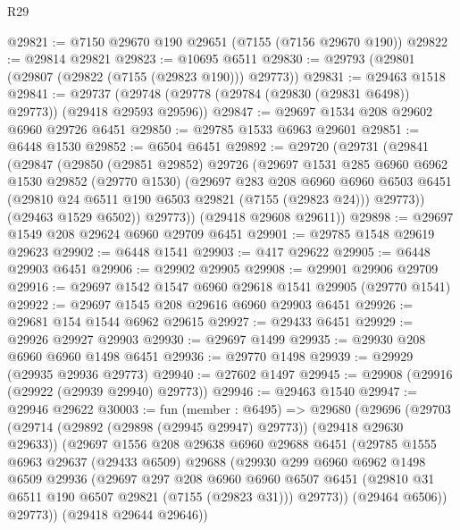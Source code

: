 \begin{lexlean}{R29}
\begin{coremodule}
@29821 := @7150 @29670 @190 @29651 (@7155 (@7156 @29670 @190))
@29822 := @29814 @29821
@29823 := @10695 @6511
@29830 := @29793 (@29801 (@29807 (@29822 (@7155 (@29823 @190))) @29773))
@29831 := @29463 @1518
@29841 := @29737 (@29748 (@29778 (@29784 (@29830 (@29831 @6498)) @29773)) (@29418 @29593 @29596))
@29847 := @29697 @1534 @208 @29602 @6960 @29726 @6451
@29850 := @29785 @1533 @6963 @29601
@29851 := @6448 @1530
@29852 := @6504 @6451
@29892 := @29720
    (@29731
      (@29841
        (@29847
          (@29850
            (@29851 @29852)
            @29726
            (@29697
              @1531
              @285
              @6960
              @6962
              @1530
              @29852
              (@29770 @1530)
              (@29697
                @283
                @208
                @6960
                @6960
                @6503
                @6451
                (@29810 @24 @6511 @190 @6503 @29821 (@7155 (@29823 @24)))
                @29773))
            (@29463 @1529 @6502))
          @29773))
      (@29418 @29608 @29611))
@29898 := @29697 @1549 @208 @29624 @6960 @29709 @6451
@29901 := @29785 @1548 @29619 @29623
@29902 := @6448 @1541
@29903 := @417 @29622
@29905 := @6448 @29903 @6451
@29906 := @29902 @29905
@29908 := @29901 @29906 @29709
@29916 := @29697 @1542 @1547 @6960 @29618 @1541 @29905 (@29770 @1541)
@29922 := @29697 @1545 @208 @29616 @6960 @29903 @6451
@29926 := @29681 @154 @1544 @6962 @29615
@29927 := @29433 @6451
@29929 := @29926 @29927 @29903
@29930 := @29697 @1499
@29935 := @29930 @208 @6960 @6960 @1498 @6451
@29936 := @29770 @1498
@29939 := @29929 (@29935 @29936 @29773)
@29940 := @27602 @1497
@29945 := @29908 (@29916 (@29922 (@29939 @29940) @29773))
@29946 := @29463 @1540
@29947 := @29946 @29622
@30003 := fun (member : @6495) =>
  @29680
    (@29696
      (@29703
        (@29714 (@29892 (@29898 (@29945 @29947) @29773)) (@29418 @29630 @29633))
        (@29697
          @1556
          @208
          @29638
          @6960
          @29688
          @6451
          (@29785
            @1555
            @6963
            @29637
            (@29433 @6509)
            @29688
            (@29930
              @299
              @6960
              @6962
              @1498
              @6509
              @29936
              (@29697
                @297
                @208
                @6960
                @6960
                @6507
                @6451
                (@29810 @31 @6511 @190 @6507 @29821 (@7155 (@29823 @31)))
                @29773))
            (@29464 @6506))
          @29773))
      (@29418 @29644 @29646))

\end{coremodule}
\end{lexlean}
